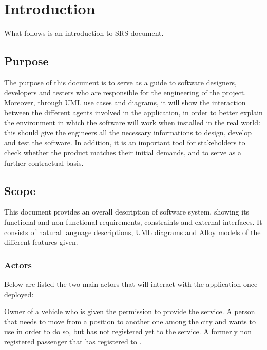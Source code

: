 \section{Introduction}      %
What follows is an introduction to \myTaxiService{} SRS document.
\subsection{Purpose}
The purpose of this document is to serve as a guide to software designers, developers and testers who are responsible for the engineering of the \myTaxiService{} project.
Moreover, through UML use cases and diagrams, it will show the interaction between the different agents involved in the application, in order to better explain the environment in which the software will work when installed in the real world: this should give the engineers all the necessary informations to design, develop and test the software.
In addition, it is an important tool for stakeholders to check whether the product matches their initial demands, and to serve as a further contractual basis.
\subsection{Scope}
This document provides an overall description of \myTaxiService{} software system, showing its functional and non-functional requirements, constraints and external interfaces.
It consists of natural language descriptions, UML diagrams and Alloy models of the different features given.
\subsubsection{Actors}
Below are listed the two main actors that will interact with the application once deployed:
\begin{itemize}
		Owner of a vehicle who is given the permission to provide the service.
	 A person that needs to move from a position to another one among the city and wants to use \myTaxiService{} in order to do so, but has not registered yet to the service.
	 A formerly non registered passenger that has registered to \myTaxiService{}.
\end{itemize}

